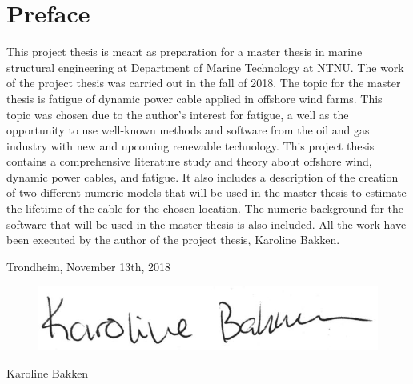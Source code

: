 \hypersetup{pageanchor=true}
%
\chapter*{Preface}
This project thesis is meant as preparation for a master thesis in marine structural engineering at Department of Marine Technology at NTNU. The work of the project thesis was carried out in the fall of 2018. \newline
\newline
The topic for the master thesis is fatigue of dynamic power cable applied in offshore wind farms. This topic was chosen due to the author's interest for fatigue, a well as the opportunity to use well-known methods and software from the oil and gas industry with new and upcoming renewable technology. This project thesis contains a comprehensive literature study and theory about offshore wind, dynamic power cables, and fatigue. It also includes a description of the creation of two different numeric models that will be used in the master thesis to estimate the lifetime of the cable for the chosen location. The numeric background for the software that will be used in the master thesis is also included. \newline
\newline
All the work have been executed by the author of the project thesis, Karoline Bakken. 
\newline
\newline
\newline
\newline
\newline
\newline
\begin{center}
    Trondheim, November 13th, 2018
    \end{center}
\begin{figure}[H]
\centering
\includegraphics[scale=0.5]{figures/sign}
\end{figure}
\begin{center}
Karoline Bakken
\end{center}